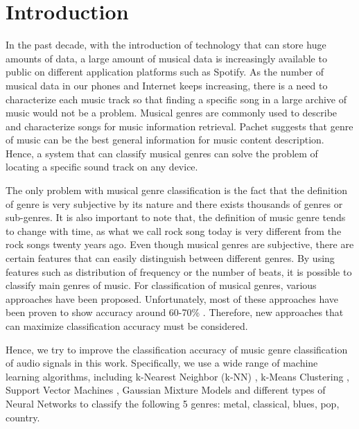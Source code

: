 \section{Introduction}
In the past decade, with the introduction of technology that can store huge amounts of data, a large amount of musical data is increasingly available to public on different application platforms such as Spotify. As the number of musical data in our phones and Internet keeps increasing, there is a need to characterize each music track so that finding a specific song in a large archive of music would not be a problem. Musical genres are commonly used to describe and characterize songs for music information retrieval. Pachet \cite{Pachet:2003} suggests that genre of music can be the best general information for music content description. Hence, a system that can classify musical genres can solve the problem of locating a specific sound track on any device. 

The only problem with musical genre classification is the fact that the definition of genre is very subjective by its nature and there exists thousands of genres or sub-genres. It is also important to note that, the definition of music genre tends to change with time, as what we call rock song today is very different from the rock songs twenty years ago. Even though musical genres are subjective, there are certain features that can easily distinguish between different genres. By using features such as distribution of frequency or the number of beats, it is possible to classify main genres of music. For classification of musical genres, various approaches have been proposed. Unfortunately, most of these approaches have been proven to show accuracy around 60-70\% \cite{GTZAN:2002}. Therefore, new approaches that can maximize classification accuracy must be considered.  

Hence, we try to improve the classification accuracy of music genre classification of audio signals in this work. Specifically, we use a wide range of machine learning algorithms, including k-Nearest Neighbor (k-NN) \cite{KNN:2009}, k-Means Clustering \cite{Clustering:2001}, Support Vector Machines \cite{SVM:2006}, Gaussian Mixture Models \cite{Pachet:2003} and different types of Neural Networks to classify the following 5 genres: metal, classical, blues, pop, country. 

